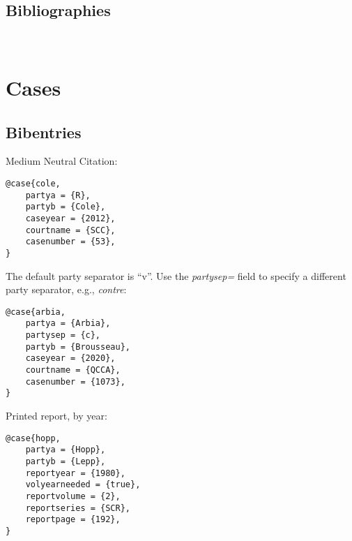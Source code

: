\subsection{Bibliographies}

\newpage
\let\xoldtwocolumn\twocolumn
\iftoggle{printlegtoc}{%
\let\oldtwocolumn\twocolumn
\renewcommand{\twocolumn}[1][]{#1}
\let\oldclearpage\clearpage
\renewcommand\clearpage{\relax}
\printindex[cases]
\sindex[general]{Table of Cases}
\printindex[legislation]
\iftoggle{printregulations}{\printindex[regulations]}{}
\renewcommand{\twocolumn}[1][]{\oldtwocolumn}
\renewcommand\clearpage{\oldclearpage}
}{}
\bigskip
\hfill{}\hfill\ %
\bigskip


\newpage


\section{Cases}
\subsection{Bibentries}

Medium Neutral Citation: \par\bigskip
\begin{verbatim}
@case{cole,
	partya = {R},
	partyb = {Cole},
	caseyear = {2012},
	courtname = {SCC},
	casenumber = {53},
}
\end{verbatim}

The default party separator is ``v''. Use the \textit{partysep=} field to specify a different party separator, e.g., \textit{contre}: \par\bigskip
 
\begin{verbatim}
@case{arbia,
	partya = {Arbia},
	partysep = {c},
	partyb = {Brousseau},
	caseyear = {2020},
	courtname = {QCCA},
	casenumber = {1073},
}
\end{verbatim}




Printed report, by year: \par\bigskip
\begin{verbatim}
@case{hopp,
	partya = {Hopp},
	partyb = {Lepp},
	reportyear = {1980},
	volyearneeded = {true},
	reportvolume = {2},
	reportseries = {SCR},
	reportpage = {192},
}
\end{verbatim}

